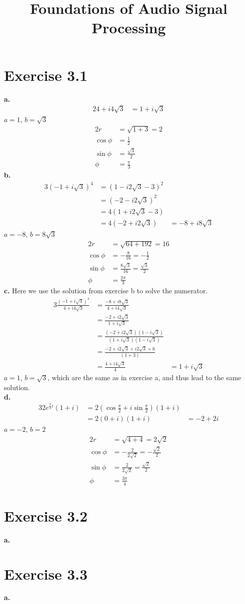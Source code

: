 \documentclass[12pt]{article}
\title{Foundations of Audio Signal Processing\\ \ass}
\author{\auth}
\begin{document}
	\maketitle
	\section*{Exercise 3.1}
	\textbf{a.}
	\begin{alignat*}{2}
	4 + i 4\sqrt{3} &= 1 + i \sqrt{3}
	\end{alignat*}
	$a = 1$, $b = \sqrt{3}$
	\begin{alignat*}{2}
		r &= \sqrt{1 + 3} = 2\\
		\cos\phi &= \frac{1}{2}\\
		\sin\phi &= \frac{\sqrt{3}}{2}\\
		\phi &= \frac{\pi}{3}
	\end{alignat*}
	\textbf{b.}
	\begin{alignat*}{3}
		(-1 + i \sqrt{3})^4 &= (1 - i 2 \sqrt{3} - 3)^2\\
		&= (- 2 - i 2 \sqrt{3})^2\\
		&= 4 (1 + i 2 \sqrt{3} - 3)\\
		&= 4 (-2 + i 2 \sqrt{3}) &= -8 + i 8 \sqrt{3} 
	\end{alignat*}
	$a = -8$, $b = 8\sqrt{3}$
	\begin{alignat*}{2}
	r &= \sqrt{64 + 192} = 16\\
	\cos\phi &= -\frac{8}{16} = -\frac{1}{2}\\
	\sin\phi &= \frac{8\sqrt{3}}{16} = \frac{\sqrt{3}}{2}\\
	\phi &= \frac{2\pi}{3}
	\end{alignat*}
	\textbf{c.} Here we use the solution from exercise b to solve the numerator.
	\begin{alignat*}{3}
	\frac{(-1 + i \sqrt{3})^4}{4 + i 4 \sqrt{3}} &= \frac{-8 + i 8 \sqrt{3}}{4 + i 4 \sqrt{3}}\\
	&= \frac{-2 + i 2 \sqrt{3}}{1 + i \sqrt{3}}\\
	&= \frac{(-2 + i 2 \sqrt{3})(1 - i \sqrt{3})}{(1 + i \sqrt{3})(1 - i \sqrt{3})}\\
	&= \frac{-2 + i 2 \sqrt{3} + i 2\sqrt{3} + 6}{(1 + 3)}\\
	&= \frac{4 + i 4\sqrt{3}}{4} &= 1 + i \sqrt{3}
	\end{alignat*}
	$a = 1$, $b = \sqrt{3}$, which are the same as in exercise a, and thus lead to the same solution.\\
	\textbf{d.}
	\begin{alignat*}{3}
	2 e^{\frac{\pi}{2} i}(1 + i ) &= 2 (\cos\frac{\pi}{2} + i\sin \frac{\pi}{2})(1 + i)\\
	&= 2(0 + i)(1 + i) &= -2 + 2i
	\end{alignat*}
	$a = -2$, $b = 2$
	\begin{alignat*}{2}
	r &= \sqrt{4 + 4} = 2\sqrt{2}\\
	\cos\phi &= -\frac{2}{2\sqrt{2}} = -\frac{\sqrt{2}}{2}\\
	\sin\phi &= \frac{2}{2\sqrt{2}} = \frac{\sqrt{2}}{2}\\
	\phi &= \frac{3\pi}{4}
	\end{alignat*}
	\section*{Exercise 3.2}
	\textbf{a.}
	\section*{Exercise 3.3}
	\textbf{a.}
\end{document}
